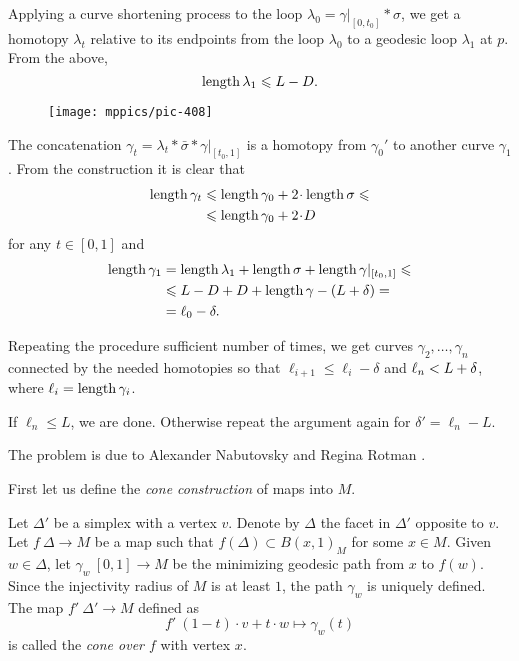 Applying a curve shortening process to the loop $\lambda_0=\gamma|_{[0,t_0]}*\sigma$, 
we get a  homotopy $\lambda_t$
relative to its endpoints 
from the loop $\lambda_0$ to a geodesic loop $\lambda_1$ at $p$.
From the above, 
\[\operatorname{\rm length}\lambda_1\leqslant L-D.\]

\begin{wrapfigure}{o}{31 mm}
\vskip-6mm
\centering
\texttt{[image: mppics/pic-408]}
\end{wrapfigure}

The concatenation $\gamma_t=\lambda_t*\bar\sigma*\gamma|_{[t_0,1]}$
is a homotopy
from $\gamma_0'$ to another curve $\gamma_1$.
From the construction it is clear that 
\begin{align*}
 \length \gamma_t&\le \length \gamma_0+2\cdot \length\sigma\le
 \\
 &\le \length \gamma_0+2\cdot D
\end{align*}
for any $t\in[0,1]$
and 
\begin{align*}
 \operatorname{\rm length} \gamma_1&=\operatorname{\rm length}\lambda_1+\operatorname{\rm length}\sigma+\operatorname{\rm length}\gamma|_{[t_0,1]}\leqslant
\\ &\leqslant L-D+D+\operatorname{\rm length}\gamma-(L+\delta)=
\\ &=\ell_0 -\delta.
\end{align*}

Repeating the procedure sufficient number of times, we get curves $\gamma_2,\dots,\gamma_n$
connected by the needed homotopies so that 
$\ell_{i+1}\le\ell_i-\delta$ and $\ell_n\z< L+\delta$,
where $\ell_i=\operatorname{\rm length}\gamma_i$.

If $\ell_n\le L$, we are done.
Otherwise repeat the argument again for $\delta'=\ell_n-L$.
\qeds

The problem is due to 
Alexander Nabutovsky 
and Regina Rotman \cite{nabutovsky-rotman}.


First let us define the {}\emph{cone construction} of maps into $M$.

Let $\Delta'$ be a simplex 
with a vertex $v$.
Denote by $\Delta$ the facet in $\Delta'$ opposite to $v$.
Let $f\:\Delta\to M$ be a map such that $f(\Delta)\subset B(x,1)_M$ for some $x \in M$.
Given $w\in \Delta$, let $\gamma_w\:[0,1]\to M$ be the minimizing geodesic path from $x$ to  $f(w)$.
Since the injectivity radius of $M$ is at least $1$, the path $\gamma_w$ is uniquely defined.
The map $f'\:\Delta'\to M$ defined as 
\[f'\:(1-t)\cdot v+t\cdot w\mapsto \gamma_w(t)\] 
is called the {}\emph{cone over $f$} with vertex $x$. 

